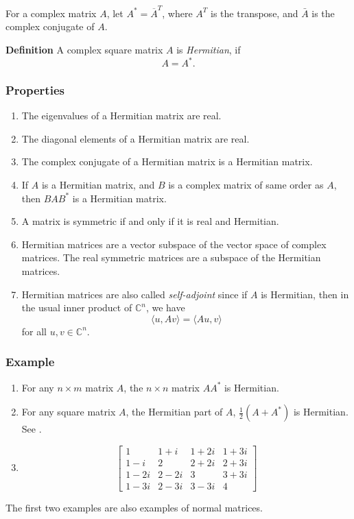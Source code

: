 \documentclass{article}
\begin{document}
For a complex matrix $A$, let $A^\ast=\overline{A}^{T}$, where 
$A^T$ is the transpose, and $\bar{A}$ is the complex conjugate of $A$.

{\bf Definition}
A complex square matrix $A$ is \emph{Hermitian}, if 
$$ A = A^*. $$

\subsubsection*{Properties}
\begin{enumerate}
\item The eigenvalues of a Hermitian matrix are real.
\item The diagonal elements of a Hermitian matrix are real.
\item The complex conjugate of a Hermitian matrix is a Hermitian matrix.
\item If $A$ is a Hermitian matrix, and $B$ is a complex matrix
of same order as $A$, then $BAB^\ast$ is a Hermitian matrix.
\item A matrix is symmetric if and only if it is real and Hermitian.
\item Hermitian matrices are a vector subspace of the vector space of 
complex matrices. 
The real symmetric matrices are a subspace of the Hermitian matrices.
\item Hermitian matrices are also called \emph{self-adjoint} since if $A$ is
Hermitian, then in the usual
inner product of $\mathbb{C}^n$, we have 
$$ \langle u,Av \rangle = \langle Au,v\rangle$$
for all $u,v\in \mathbb{C}^n$.

\end{enumerate}

\subsubsection*{Example}
\begin{enumerate}
\item For any $n\times m$ matrix $A$, the $n\times n$ matrix $A A^\ast$ is
Hermitian. 
\item For any square matrix $A$, the Hermitian part of $A$,  
      $\frac{1}{2}(A+A^\ast)$ is Hermitian. 
      See .
\item 
$$ \begin{bmatrix}
  1 & 1 + i & 1 + 2i & 1 + 3i \\
  1 - i & 2 & 2 + 2i & 2 + 3i \\
  1 - 2i & 2 - 2i & 3 & 3 + 3i \\
  1 - 3i & 2 - 3i & 3 - 3i & 4
\end{bmatrix} $$
\end{enumerate}
The first two examples are also examples of normal matrices.
\end{document}
